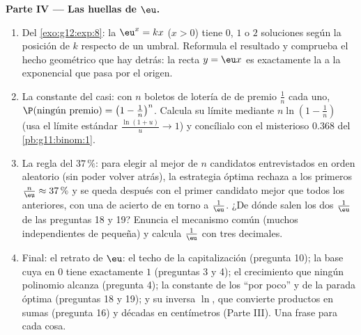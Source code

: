 \begin{problem}
\medskip
\noindent\textbf{Parte IV --- Las huellas de $\eu$.}
\begin{enumerate}[resume]
  \item Del \cref{exo:g12:exp:8}: la  $\eu^x = kx$ ($x > 0$) tiene
        $0$, $1$ o $2$ soluciones según la posición de $k$ respecto de un
        umbral. Reformula el resultado y comprueba el hecho geométrico que
        hay detrás: la recta $y = \eu x$ es exactamente la  a la
        exponencial que pasa por el origen.
  \item La constante del casi: con $n$ boletos de lotería de 
        de premio $\frac1n$ cada uno,
        $\P(\text{ningún premio}) = \left(1 - \frac1n\right)^n$. Calcula su
        límite mediante $n \ln\!\left(1 - \frac1n\right)$ (usa el límite
        estándar $\frac{\ln(1 + u)}{u} \to 1$) y concílialo con el
        misterioso $0.368$ del \cref{pb:g11:binom:1}.
  \item La regla del $37\,\%$: para elegir al mejor de $n$ candidatos
        entrevistados en orden aleatorio (sin poder volver atrás), la
        estrategia óptima rechaza a los primeros
        $\frac{n}{\eu} \approx 37\,\%$ y se queda después con el primer
        candidato mejor que todos los anteriores, con una  de
        acierto de en torno a $\frac1\eu$. ¿De dónde salen los dos
        $\frac1\eu$ de las preguntas 18 y 19? Enuncia el mecanismo común
        (muchos  independientes de  pequeña) y calcula
        $\frac1\eu$ con tres decimales.
  \item Final: el retrato de $\eu$: el techo de la capitalización (pregunta
        10); la base cuya  en $0$ tiene  exactamente $1$
        (preguntas 3 y 4); el crecimiento que ningún polinomio alcanza
        (pregunta 4); la constante de los ``por poco'' y de la parada
        óptima (preguntas 18 y 19); y su inversa $\ln$, que convierte
        productos en sumas (pregunta 16) y décadas en centímetros (Parte
        III). Una frase para cada cosa.
\end{enumerate}
\end{problem}

